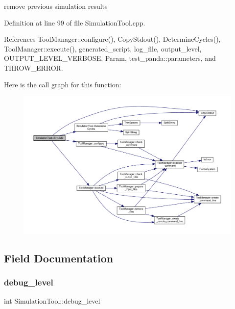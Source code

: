 remove previous simulation results 

Definition at line 99 of file Simulation\+Tool.\+cpp.



References Tool\+Manager\+::configure(), Copy\+Stdout(), Determine\+Cycles(), Tool\+Manager\+::execute(), generated\+\_\+script, log\+\_\+file, output\+\_\+level, O\+U\+T\+P\+U\+T\+\_\+\+L\+E\+V\+E\+L\+\_\+\+V\+E\+R\+B\+O\+SE, Param, test\+\_\+panda\+::parameters, and T\+H\+R\+O\+W\+\_\+\+E\+R\+R\+OR.

Here is the call graph for this function\+:
\nopagebreak
\begin{figure}[H]
\begin{center}
\leavevmode
\includegraphics[width=350pt]{d5/dfc/classSimulationTool_a1686af5b980c7e8dfa848ff616384627_cgraph}
\end{center}
\end{figure}


\subsection{Field Documentation}
\mbox{\label{classSimulationTool_a8fcf300968d03e86e9180626e7f6ec22}} 
\subsubsection{\texorpdfstring{debug\+\_\+level}{debug\_level}}
{\footnotesize\ttfamily int Simulation\+Tool\+::debug\+\_\+level\hspace{0.3cm}{\ttfamily [protected]}}



